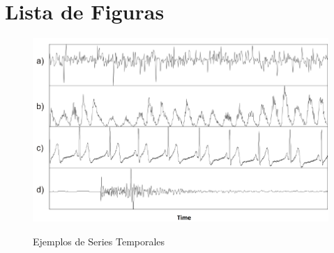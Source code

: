 \section{Lista de Figuras}
\begin{figure}[h]
\vspace{0.1in}
\begin{center}
\includegraphics[scale=0.7]{timeSeries.png}\\
\end{center}
\caption{Ejemplos de Series Temporales}
\label{arm:fig1}
\end{figure}
\clearpage